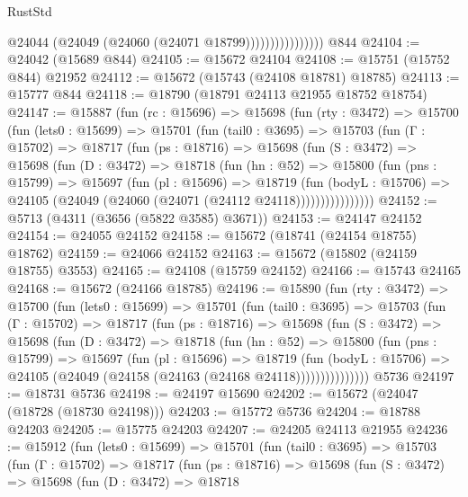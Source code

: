 \begin{lexlean}{RustStd}
\begin{coremodule}
                            @24044 (@24049 (@24060 (@24071 @18799))))))))))))))))
    @844
@24104 := @24042 (@15689 @844)
@24105 := @15672 @24104
@24108 := @15751 (@15752 @844) @21952
@24112 := @15672 (@15743 (@24108 @18781) @18785)
@24113 := @15777 @844
@24118 := @18790 (@18791 @24113 @21955 @18752 @18754)
@24147 := @15887
    (fun (rc : @15696) =>
    @15698
      (fun (rty : @3472) =>
      @15700
        (fun (lets0 : @15699) =>
        @15701
          (fun (tail0 : @3695) =>
          @15703
            (fun (Γ : @15702) =>
            @18717
              (fun (ps : @18716) =>
              @15698
                (fun (S : @3472) =>
                @15698
                  (fun (D : @3472) =>
                  @18718
                    (fun (hn : @52) =>
                    @15800
                      (fun (pns : @15799) =>
                      @15697
                        (fun (pl : @15696) =>
                        @18719
                          (fun (bodyL : @15706) =>
                          @24105 (@24049 (@24060 (@24071 (@24112 @24118))))))))))))))))
@24152 := @5713 (@4311 (@3656 (@5822 @3585) @3671))
@24153 := @24147 @24152
@24154 := @24055 @24152
@24158 := @15672 (@18741 (@24154 @18755) @18762)
@24159 := @24066 @24152
@24163 := @15672 (@15802 (@24159 @18755) @3553)
@24165 := @24108 (@15759 @24152)
@24166 := @15743 @24165
@24168 := @15672 (@24166 @18785)
@24196 := @15890
    (fun (rty : @3472) =>
    @15700
      (fun (lets0 : @15699) =>
      @15701
        (fun (tail0 : @3695) =>
        @15703
          (fun (Γ : @15702) =>
          @18717
            (fun (ps : @18716) =>
            @15698
              (fun (S : @3472) =>
              @15698
                (fun (D : @3472) =>
                @18718
                  (fun (hn : @52) =>
                  @15800
                    (fun (pns : @15799) =>
                    @15697
                      (fun (pl : @15696) =>
                      @18719
                        (fun (bodyL : @15706) =>
                        @24105 (@24049 (@24158 (@24163 (@24168 @24118)))))))))))))))
    @5736
@24197 := @18731 @5736
@24198 := @24197 @15690
@24202 := @15672 (@24047 (@18728 (@18730 @24198)))
@24203 := @15772 @5736
@24204 := @18788 @24203
@24205 := @15775 @24203
@24207 := @24205 @24113 @21955
@24236 := @15912
    (fun (lets0 : @15699) =>
    @15701
      (fun (tail0 : @3695) =>
      @15703
        (fun (Γ : @15702) =>
        @18717
          (fun (ps : @18716) =>
          @15698
            (fun (S : @3472) =>
            @15698
              (fun (D : @3472) =>
              @18718

\end{coremodule}
\end{lexlean}
